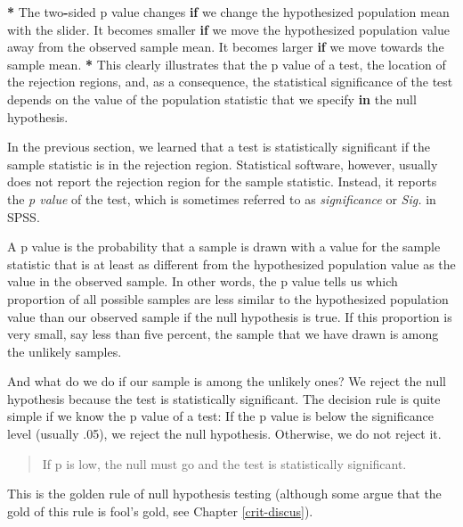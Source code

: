 \documentclass[a4paper]{book}
\newenvironment{Shaded}{\begin{snugshade}}{\end{snugshade}}
\newcommand{\StringTok}[1]{\textcolor[rgb]{0.00,0.00,0.00}{#1}}
\newcommand{\ControlFlowTok}[1]{\textcolor[rgb]{0.00,0.00,0.00}{\textbf{#1}}}
\newcommand{\OperatorTok}[1]{\textcolor[rgb]{0.00,0.00,0.00}{\textbf{#1}}}
\newcommand{\NormalTok}[1]{#1}
\theoremstyle{definition}
\theoremstyle{definition}
\theoremstyle{definition}
\theoremstyle{remark}
\begin{document}
\begin{Shaded}
\begin{Highlighting}[]
\OperatorTok{*}\StringTok{ }\NormalTok{The two}\OperatorTok{-}\NormalTok{sided p value changes }\ControlFlowTok{if}\NormalTok{ we change the hypothesized population mean}
\NormalTok{with the slider. It becomes smaller }\ControlFlowTok{if}\NormalTok{ we move the hypothesized population}
\NormalTok{value away from the observed sample mean. It becomes larger }\ControlFlowTok{if}\NormalTok{ we move towards}
\NormalTok{the sample mean.}
\OperatorTok{*}\StringTok{ }\NormalTok{This clearly illustrates that the p value of a test, the location of the}
\NormalTok{rejection regions, and, as a consequence, the statistical significance of the}
\NormalTok{test depends on the value of the population statistic that we specify }\ControlFlowTok{in}\NormalTok{ the}
\NormalTok{null hypothesis.}
\end{Highlighting}
\end{Shaded}

In the previous section, we learned that a test is statistically
significant if the sample statistic is in the rejection region.
Statistical software, however, usually does not report the rejection
region for the sample statistic. Instead, it reports the \emph{p value}
of the test, which is sometimes referred to as \emph{significance} or
\emph{Sig.} in SPSS.

A p value is the probability that a sample is drawn with a value for the
sample statistic that is at least as different from the hypothesized
population value as the value in the observed sample. In other words,
the p value tells us which proportion of all possible samples are less
similar to the hypothesized population value than our observed sample if
the null hypothesis is true. If this proportion is very small, say less
than five percent, the sample that we have drawn is among the unlikely
samples.

And what do we do if our sample is among the unlikely ones? We reject
the null hypothesis because the test is statistically significant. The
decision rule is quite simple if we know the p value of a test: If the p
value is below the significance level (usually .05), we reject the null
hypothesis. Otherwise, we do not reject it.

\begin{quote}
If p is low, the null must go and the test is statistically significant.
\end{quote}

This is the golden rule of null hypothesis testing (although some argue
that the gold of this rule is fool's gold, see Chapter
\ref{crit-discus}).
\end{document}
